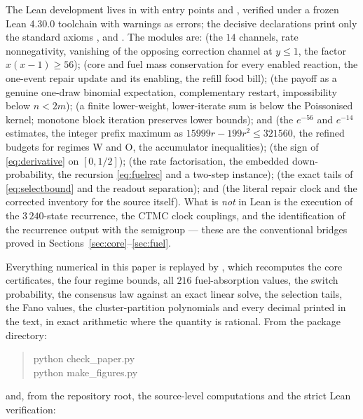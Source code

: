 \documentclass[11pt,a4paper]{article}
\theoremstyle{plain}
\theoremstyle{definition}
\theoremstyle{remark}
\begin{document}
The Lean development lives in  with entry
points  and , verified under a frozen Lean 4.30.0
toolchain with warnings as errors; the decisive declarations print only the standard
axioms ,  and . The modules are:
 (the $14$ channels, rate nonnegativity, vanishing of the opposing
correction channel at $y\le1$, the factor $x(x-1)\ge56$);  (core and fuel
mass conservation for every enabled reaction, the one-event repair update and its
enabling, the refill food bill);  (the payoff as a genuine one-draw
binomial expectation, complementary restart, impossibility below $n<2m$);
 (a finite lower-weight, lower-iterate sum is below the
Poissonised kernel; monotone block iteration preserves lower bounds); 
and  (the $e^{-56}$ and $e^{-14}$ estimates, the integer prefix maximum
as $15999r-199r^{2}\le321560$, the refined budgets for regimes W and O, the accumulator
inequalities);  (the sign of \eqref{eq:derivative} on $[0,1/2]$);
 (the rate factorisation, the embedded down-probability, the
recursion \eqref{eq:fuelrec} and a two-step instance);  (the exact
tails of \eqref{eq:selectbound} and the readout separation); and 
(the literal repair clock and the corrected inventory for the source itself). What is
\emph{not} in Lean is the execution of the $3\,240$-state recurrence, the CTMC clock
couplings, and the identification of the recurrence output with the semigroup --- these are
the conventional bridges proved in Sections~\ref{sec:core}--\ref{sec:fuel}.

Everything numerical in this paper is replayed by , which recomputes
the core certificates, the four regime bounds, all $216$ fuel-absorption values, the
switch probability, the consensus law against an exact linear solve, the selection tails,
the Fano values, the cluster-partition polynomials and every decimal printed in the text,
in exact arithmetic where the quantity is rational. From the package directory:

\begin{quote}\small\ttfamily
python check\_paper.py\\
python make\_figures.py
\end{quote}

\noindent and, from the repository root, the source-level computations and the strict Lean
verification:
\end{document}
